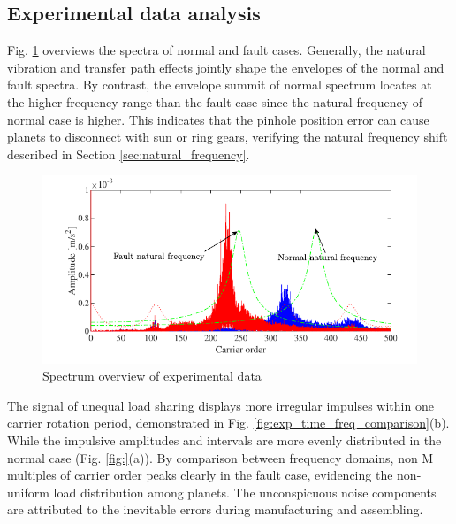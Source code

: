 \documentclass[a4paper,fleqn]{cas-sc}%
\begin{document}
\subsection{Experimental data analysis}
\par Fig. \ref{fig:exp_natural_frequency_shift} overviews the spectra of normal and fault cases. Generally, the natural vibration and transfer path effects jointly shape the envelopes of the normal and fault spectra. By contrast, the envelope summit of normal spectrum locates at the higher frequency range than the fault case since the natural frequency of normal case is higher. This indicates that the pinhole position error can cause planets to disconnect with sun or ring gears, verifying the natural frequency shift described in Section \ref{sec:natural_frequency}.
\begin{figure}[pos=htbp]
    \centering
    \includegraphics{Exp_natural_frequency_shift.pdf}
    \caption{Spectrum overview of experimental data}
    \label{fig:exp_natural_frequency_shift}
\end{figure}
\par The signal of unequal load sharing displays more irregular impulses within one carrier rotation period, demonstrated in Fig. \ref{fig:exp_time_freq_comparison}(b).  While the impulsive amplitudes and intervals are more evenly distributed in the normal case (Fig. \ref{fig:}(a)). By comparison between frequency domains, non M multiples of carrier order peaks clearly in the fault case, evidencing the non-uniform load distribution among planets. The unconspicuous noise components are attributed to the inevitable errors during manufacturing and assembling.
\end{document}
